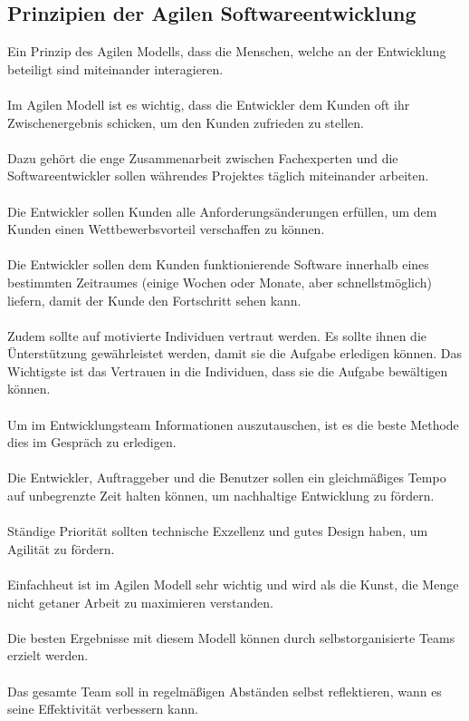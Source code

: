 \documentclass[a4paper, 10pt]{scrartcl}
\begin{document}
\subsection{Prinzipien der Agilen Softwareentwicklung}
Ein Prinzip des Agilen Modells, dass die Menschen, welche an der Entwicklung beteiligt sind miteinander interagieren.\\\\
Im Agilen Modell ist es wichtig, dass die Entwickler dem Kunden oft ihr Zwischenergebnis schicken, um den Kunden zufrieden zu stellen.\\\\
Dazu gehört die enge Zusammenarbeit zwischen Fachexperten und die Softwareentwickler sollen währendes Projektes täglich miteinander arbeiten.\\\\
Die Entwickler sollen Kunden alle Anforderungsänderungen erfüllen, um dem Kunden einen Wettbewerbsvorteil verschaffen zu können.\\\\
Die Entwickler sollen dem Kunden funktionierende Software innerhalb eines bestimmten Zeitraumes (einige Wochen oder Monate, aber schnellstmöglich) liefern, damit der Kunde den Fortschritt sehen kann.\\\\
Zudem sollte auf motivierte Individuen vertraut werden. Es sollte ihnen die Ünterstützung gewährleistet werden, damit sie die Aufgabe erledigen können. Das Wichtigste ist das Vertrauen in die Individuen, dass sie die Aufgabe bewältigen können.\\\\
Um im Entwicklungsteam Informationen auszutauschen, ist es die beste Methode dies im Gespräch zu erledigen.\\\\
Die Entwickler, Auftraggeber und die Benutzer sollen ein gleichmäßiges Tempo auf unbegrenzte Zeit halten können, um nachhaltige Entwicklung zu fördern.\\\\
Ständige Priorität sollten technische Exzellenz und gutes Design haben, um Agilität zu fördern.\\\\
Einfachheut ist im Agilen Modell sehr wichtig und wird als \glqq{}die Kunst, die Menge nicht
getaner Arbeit zu maximieren\grqq{}\cite{Beck2013} verstanden.\\\\
Die besten Ergebnisse mit diesem Modell können durch selbstorganisierte Teams erzielt werden.\\\\
Das gesamte Team soll in regelmäßigen Abständen selbst reflektieren, wann es seine Effektivität verbessern kann. \citep{Beck2013}
\end{document}

